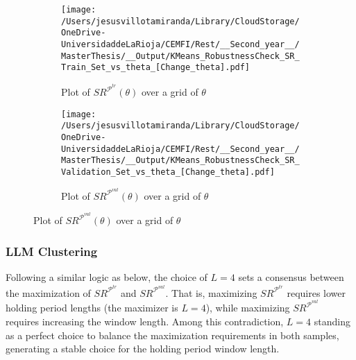 \begin{figure}[H]
  \caption{Sharpe Ratios in the train and validation splits as a function of $\theta$}
  \centering
    \begin{subfigure}[b]{0.46\textwidth}
    \centering
    \texttt{[image: /Users/jesusvillotamiranda/Library/CloudStorage/OneDrive-UniversidaddeLaRioja/CEMFI/Rest/\_\_Second\_year\_\_/MasterThesis/\_\_Output/KMeans\_RobustnessCheck\_SR\_Train\_Set\_vs\_theta\_[Change\_theta].pdf]}
    \caption{Plot of $SR^{\mathcal P^{tr}}(\theta)$ over a grid of $\theta$}
    \label{fig:K_hyp_3}
  \end{subfigure}
  \hspace{0.05\textwidth} %
  \begin{subfigure}[b]{0.46\textwidth}
    \centering
    \texttt{[image: /Users/jesusvillotamiranda/Library/CloudStorage/OneDrive-UniversidaddeLaRioja/CEMFI/Rest/\_\_Second\_year\_\_/MasterThesis/\_\_Output/KMeans\_RobustnessCheck\_SR\_Validation\_Set\_vs\_theta\_[Change\_theta].pdf]}
    \caption{Plot of $SR^{\mathcal P^{val}}(\theta)$ over a grid of $\theta$}
    \label{fig:K_hyp_4}
  \end{subfigure}
  \label{fig:KMeans_hyperparameter_justification_theta}
\end{figure}


\subsubsection{LLM Clustering}
Following a similar logic as below, the choice of $L=4$ sets a consensus between the maximization of $SR^{\mathcal P^{tr}}$ and $SR^{\mathcal P^{val}}$. That is, maximizing $SR^{\mathcal P^{tr}}$ requires lower holding period lengths (the maximizer is $L=4$), while maximizing $SR^{\mathcal P^{val}}$ requires increasing the window length. Among this contradiction, $L=4$ standing as a perfect choice to balance the maximization requirements in both samples, generating a stable choice for the holding period window length.

